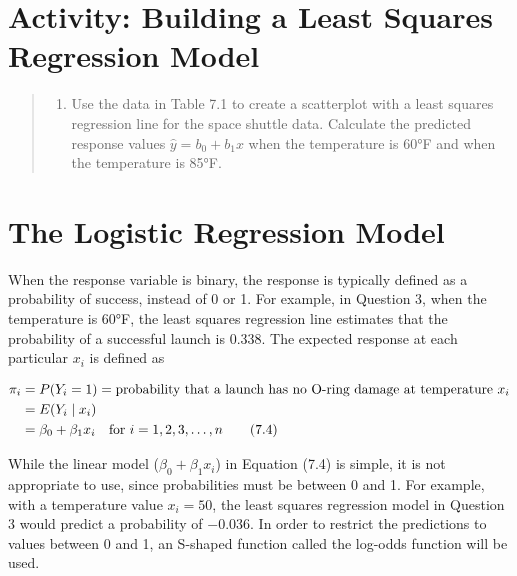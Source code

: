 \documentclass[
]{report}
\providecommand{\tightlist}{%
  \setlength{\itemsep}{0pt}\setlength{\parskip}{0pt}}
\begin{document}
\section*{Activity: Building a Least Squares Regression Model}\label{activity-building-a-least-squares-regression-model}

\begin{quote}
\begin{enumerate}
\def\labelenumi{\arabic{enumi}.}
\setcounter{enumi}{2}
\tightlist
\item
  Use the data in Table 7.1 to create a scatterplot with a least squares regression line for the space shuttle data. Calculate the predicted response values \(\hat y = b_0 + b_1 x\) when the temperature is 60°F and when the temperature is 85°F.
\end{enumerate}
\end{quote}

\section{\texorpdfstring{\textbf{The Logistic Regression Model}}{The Logistic Regression Model}}\label{the-logistic-regression-model}

When the response variable is binary, the response is typically defined as a probability of success, instead of 0 or 1. For example, in Question 3, when the temperature is 60°F, the least squares regression line estimates that the probability of a successful launch is 0.338. The expected response at each particular \(x_i\) is defined as

\begin{align}
\pi_i &= P(Y_i = 1) = \text{probability that a launch has no O-ring damage at temperature } x_i \notag \\
      &= E(Y_i \mid x_i) \notag \\
      &= \beta_0 + \beta_1 x_i \quad \text{for } i = 1,2,3,\dots,n \tag{7.4}
\end{align}

While the linear model (\(\beta_0 + \beta_1 x_i\)) in Equation (7.4) is simple, it is not appropriate to use, since probabilities must be between 0 and 1. For example, with a temperature value \(x_i = 50\), the least squares regression model in Question 3 would predict a probability of \(-0.036\). In order to restrict the predictions to values between 0 and 1, an S-shaped function called the log-odds function will be used.
\end{document}
